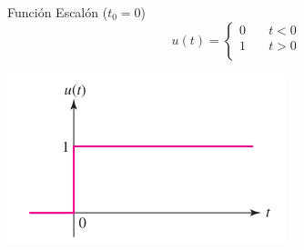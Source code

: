 \documentclass[xcolor={usenames,svgnames,dvipsnames}]{beamer}
\begin{document}
\begin{frame}[label={sec:org14585dc}]{Función Escalón (\(t_0 = 0\))}
\[   
u(t) = 
     \begin{cases}
       0 &\quad t < 0\\
       1 &\quad t > 0\\
     \end{cases}
\]

\begin{center}
\includegraphics[width=.9\linewidth]{figs/funcion_escalon0.pdf}
\end{center}
\end{frame}
\end{document}

